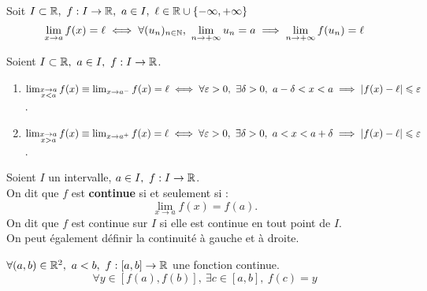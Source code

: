 \begin{theorem}
	Soit $I \subset \mathbb{R},\ f : I \to \mathbb{R},\ a \in I,\ \ell \in \mathbb{R} \cup \{-\infty, +\infty\}$
	\[ \lim_{x \to a} f(x) = \ell \iff \forall (u_n)_{n \in \mathbb{N}},\ \lim_{n \to +\infty} u_n = a \implies \lim_{n \to +\infty} f(u_n) = \ell \]
\end{theorem}

\begin{definition}
    Soient $I \subset \mathbb{R},\ a \in I,\ f : I \to \mathbb{R} $.
    \begin{enumerate}
        \item $ \lim_{\substack{x \to a \\ x < a}} f(x) \equiv \lim_{x \to a^-} f(x) = \ell \iff \forall \varepsilon > 0,\ \exists \delta > 0,\ a - \delta < x < a \implies \abs{f(x) - \ell} \leqslant \varepsilon $.
        \item $\lim_{\substack{x \to a \\ x > a}} f(x) \equiv \lim_{x \to a^+} f(x) = \ell \iff \forall \varepsilon > 0,\ \exists \delta > 0,\ a < x < a + \delta \implies \abs{f(x) - \ell} \leqslant \varepsilon$.
    \end{enumerate}
\end{definition}

\begin{definition}[Continuité]
	Soient $I$ un intervalle, $a \in I,\ f : I \to \mathbb{R}$.
        \\ 
        On dit que $f$ est \textbf{continue} si et seulement si :
        \[\lim_{x \to a} f(x) = f(a).\] 
	On dit que $f$ est continue sur $I$ si elle est continue en tout point de $I$.\\
	On peut également définir la continuité à gauche et à droite.
\end{definition}

\begin{theorem}
	$\forall (a, b) \in \mathbb{R}^2,\ a < b,\ f : [a, b] \to \mathbb{R}$ une fonction continue.
	\[ \forall y \in [f(a), f(b)],\ \exists c \in [a, b],\ f(c) = y \]
\end{theorem}

